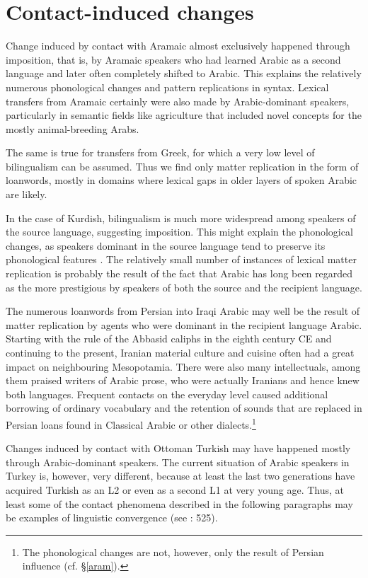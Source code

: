\documentclass[output=paper]{langsci/langscibook}
\begin{document}
\section{Contact-induced changes} 

Change induced by contact with Aramaic almost exclusively happened through imposition, that is, by Aramaic speakers who had learned Arabic as a second language and later often completely shifted to Arabic. This explains the relatively numerous phonological changes and pattern replications in syntax. Lexical transfers from Aramaic certainly were also made by Arabic-dominant speakers, particularly in semantic fields like agriculture that included novel concepts for the mostly animal-breeding Arabs.

The same is true for transfers from Greek, for which a very low level of bilingualism can be assumed. Thus we find only matter replication in the form of loanwords, mostly in domains where lexical gaps in older layers of spoken Arabic are likely. 

In the case of Kurdish, bilingualism is much more widespread among speakers of the source language, suggesting imposition. This might explain the phonological changes, as speakers dominant in the source language tend to preserve its phonological features \citep[532]{Lucas2015}. The relatively small number of instances of lexical matter replication is probably the result of the fact that Arabic has long been regarded as the more prestigious by speakers of both the source and the recipient language.

The numerous loanwords from Persian into Iraqi Arabic may well be the result of matter replication by agents who were dominant in the recipient language Arabic. Starting with the rule of the Abbasid caliphs in the eighth century CE and continuing to the present, Iranian material culture and cuisine often had a great impact on neighbouring Mesopotamia. There were also many intellectuals, among them praised writers of Arabic prose, who were actually Iranians and hence knew both languages. Frequent contacts on the everyday level caused additional borrowing of ordinary vocabulary and the retention of sounds that are replaced in Persian loans found in Classical Arabic or other dialects.\footnote{The phonological changes are not, however, only the result of Persian influence (cf. §\ref{aram}).} 

Changes induced by contact with Ottoman Turkish may have happened mostly through Arabic-dominant speakers. The current situation of Arabic speakers in Turkey is, however, very different, because at least the last two generations have acquired Turkish as an L2 or even as a second L1 at very young age. Thus, at least some of the contact phenomena described in the following paragraphs may be examples of linguistic convergence (see \citealt{Lucas2015}: 525). 
\end{document}
